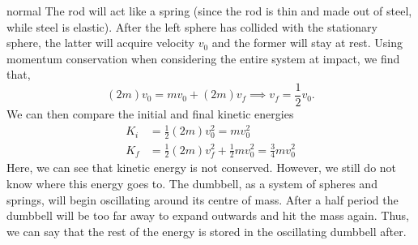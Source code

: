\begin{solution}{normal}
The rod will act like a spring (since the rod is thin and made out of steel, while steel is elastic). After the left sphere has collided with the stationary sphere, the latter will acquire velocity $v_0$ and the former will stay at rest. Using momentum conservation when considering the entire system at impact, we find that,
\[(2m)v_0 = mv_0 + (2m)v_f\implies v_f = \frac{1}{2}v_0.\]
We can then compare the initial and final kinetic energies
\begin{align*}
K_i&= \frac{1}{2}(2m)v_0^2 = mv_0^2\\
K_f&= \frac{1}{2}(2m)v_f^2 + \frac{1}{2}mv_0^2 = \frac{3}{4}mv_0^2
\end{align*}
Here, we can see that kinetic energy is not conserved. However, we still do not know where this energy goes to. The dumbbell, as a system of spheres and springs, will begin oscillating around its centre of mass. After a half period the dumbbell will be too far away to expand outwards and hit the mass again. Thus, we can say that the rest of the energy is stored in the oscillating dumbbell after.
\end{solution}
